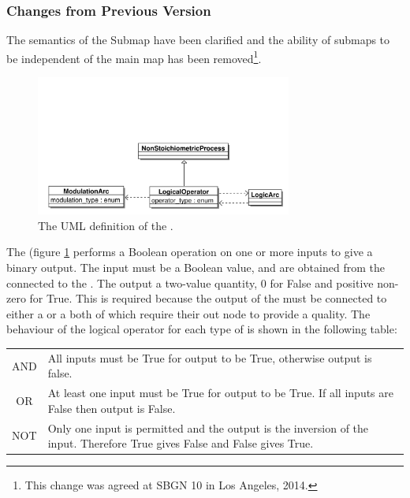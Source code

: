 \subsubsection{Changes from Previous Version}

The semantics of the Submap have been clarified and the ability of
submaps to be independent of the main map has been removed\footnote{This
  change was agreed at SBGN 10 in Los Angeles, 2014.}.

\label{sec:techref:logic}
\label{defn:LogicalOperator}

\begin{figure}[htb]
  \centering
  \includegraphics[width = 0.75\textwidth]{images/logicaloperatoruml}
  \caption{The UML definition of the .}
  \label{fig:techref:logicaloperatoruml}
\end{figure}

 The  (figure \ref{fig:techref:logicaloperatoruml} performs a Boolean operation on one or
more inputs to give a binary output. The input must be a Boolean
value, and are obtained from the  connected to the
. The output a two-value quantity,  0 for False and positive
non-zero for True. This is required because the output of the
 must be connected to either a
 or a  both of which
require their out node to provide a quality. The behaviour of the
logical operator for each type of  is shown in
the following table:

\begin{tabular}[t]{c p{12cm}}
\toprule
AND & All inputs must be True for output to be True, otherwise output
is false.\\
OR & At least one input must be True for output to be True. If all
inputs are False then output is False.\\
NOT & Only one input is permitted and the output is the inversion of
the input. Therefore True gives False and False gives True.\\
\bottomrule
\end{tabular}

